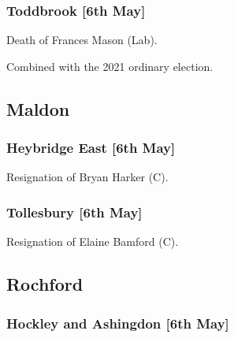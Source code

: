 \documentclass[a4paper,openany]{book}
\begin{document}
\begin{resultsiii}
\subsubsection*{Toddbrook \hspace*{\fill}\nolinebreak[1]%
	\enspace\hspace*{\fill}
	[6th May]}


Death of Frances Mason (Lab).

Combined with the 2021 ordinary election.

\subsection*{Maldon}

\subsubsection*{Heybridge East \hspace*{\fill}\nolinebreak[1]%
	\enspace\hspace*{\fill}
	[6th May]}


Resignation of Bryan Harker (C).

\subsubsection*{Tollesbury \hspace*{\fill}\nolinebreak[1]%
	\enspace\hspace*{\fill}
	[6th May]}


Resignation of Elaine Bamford (C).

\subsection*{Rochford}

\subsubsection*{Hockley and Ashingdon \hspace*{\fill}\nolinebreak[1]%
	\enspace\hspace*{\fill}
	[6th May]}


\end{resultsiii}
\end{document}

